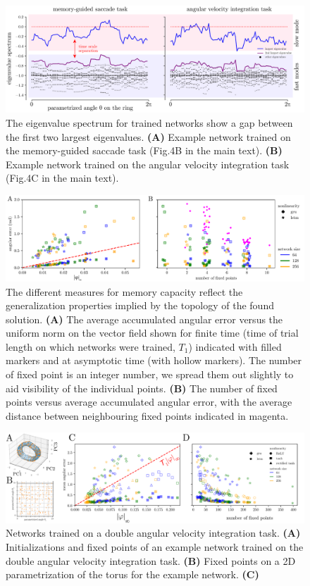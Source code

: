 \documentclass[letterpaper]{article}
\begin{document}
\begin{figure}[tbhp]
  \centering
  \includegraphics[width=\textwidth]{eigenvalue_gap}
  \caption{The eigenvalue spectrum for  trained networks  show a gap between the first two largest eigenvalues.
    \textbf{(A)} Example network trained on the memory-guided saccade task (Fig.4B in the main text).
    \textbf{(B)}   Example network trained on the angular velocity integration task (Fig.4C in the main text).
}\label{fig:eigenvalue_gap}
\end{figure}


\begin{figure}[tbhp]
  \centering
  \includegraphics[width=\textwidth]{angular_losses_lstm_gru}
  \caption{The different measures for memory capacity reflect the generalization properties implied by the topology of the found solution.
    \textbf{(A)} The average accumulated angular error versus the uniform norm on the vector field shown for finite time (time of trial length on which networks were trained, \(T_1\)) indicated with filled markers and at asymptotic time (with hollow markers). The number of fixed point is an integer number, we spread them out slightly to aid visibility of the individual points.
    \textbf{(B)}   The number of fixed points versus average accumulated angular error, with the average distance between neighbouring fixed points indicated in magenta.
}\label{fig:angular_losses_lstm_gru}
\end{figure}


\begin{figure}[tbhp]
  \centering
  \includegraphics[width=\textwidth]{davit}
  \caption{Networks trained on a double angular velocity integration task.
    \textbf{(A)} Initializations and fixed points of an example network trained on the  double angular velocity integration task.
    \textbf{(B)} Fixed points on a 2D parametrization of the torus for the example network.
    \textbf{(C)}  
}\label{fig:davit}
\end{figure}
\end{document}
